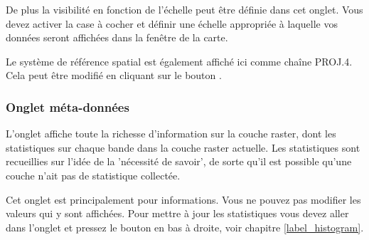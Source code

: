 De plus la visibilit\'e en fonction de l'\'echelle peut \^etre d\'efinie dans cet
onglet. Vous devez activer la case \`a cocher et d\'efinir une \'echelle appropri\'ee \`a
laquelle vos donn\'ees seront affich\'ees dans la fen\^etre de la carte.

Le syst\`eme de r\'ef\'erence spatial est \'egalement affich\'e ici comme cha\^ine PROJ.4.
Cela peut \^etre modifi\'e en cliquant sur le bouton .

\subsubsection{Onglet m\'eta-donn\'ees}\label{label_metatab}

L'onglet  affiche toute la richesse d'information sur la
couche raster, dont les statistiques sur chaque bande dans la couche raster
actuelle. Les statistiques sont recueillies sur l'id\'ee de la 'n\'ecessit\'e de
savoir', de sorte qu'il est possible qu'une couche n'ait pas de
statistique collect\'ee. 

Cet onglet est principalement pour informations. Vous ne pouvez pas modifier
les valeurs qui y sont affich\'ees. Pour mettre \`a jour les statistiques vous
devez aller dans l'onglet  et pressez le bouton
 en bas \`a droite, voir chapitre \ref{label_histogram}.

